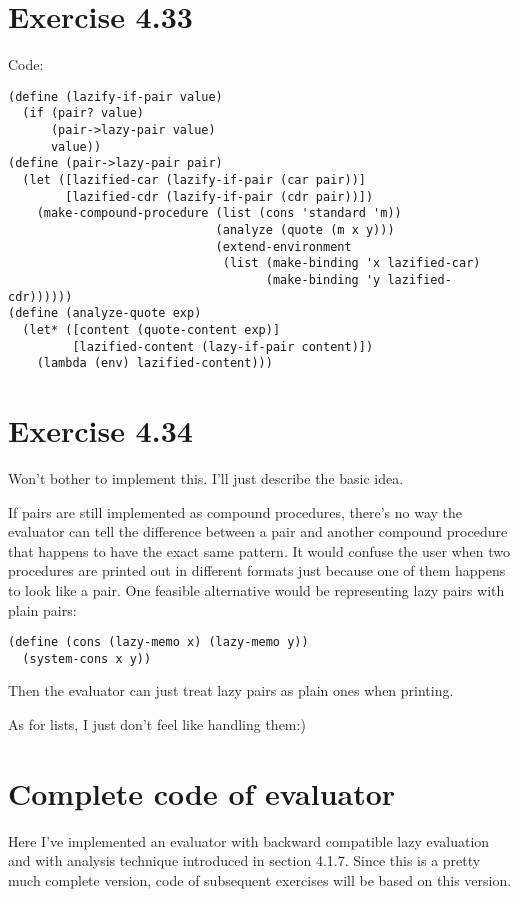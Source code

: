 \documentclass[../main.tex]{subfiles}
\begin{document}
\section{Exercise 4.33}

Code:

\begin{lstlisting}
(define (lazify-if-pair value)
  (if (pair? value)
      (pair->lazy-pair value)
      value))
(define (pair->lazy-pair pair)
  (let ([lazified-car (lazify-if-pair (car pair))]
        [lazified-cdr (lazify-if-pair (cdr pair))])
    (make-compound-procedure (list (cons 'standard 'm))
                             (analyze (quote (m x y)))
                             (extend-environment
                              (list (make-binding 'x lazified-car)
                                    (make-binding 'y lazified-cdr))))))
(define (analyze-quote exp)
  (let* ([content (quote-content exp)]
         [lazified-content (lazy-if-pair content)])
    (lambda (env) lazified-content)))
\end{lstlisting}

\section{Exercise 4.34}

Won't bother to implement this. I'll just describe the basic idea.

If pairs are still implemented as compound procedures, there's no way the evaluator can tell the difference between a pair and another compound procedure that happens to have the exact same pattern. It would confuse the user when two procedures are printed out in different formats just because one of them happens to look like a pair. One feasible alternative would be representing lazy pairs with plain pairs:

\begin{lstlisting}
(define (cons (lazy-memo x) (lazy-memo y))
  (system-cons x y))
\end{lstlisting}

Then the evaluator can just treat lazy pairs as plain ones when printing.

As for lists, I just don't feel like handling them:)

\section*{Complete code of evaluator}

Here I've implemented an evaluator with backward compatible lazy evaluation and with analysis technique introduced in section 4.1.7. Since this is a pretty much complete version, code of subsequent exercises will be based on this version.
\end{document}
